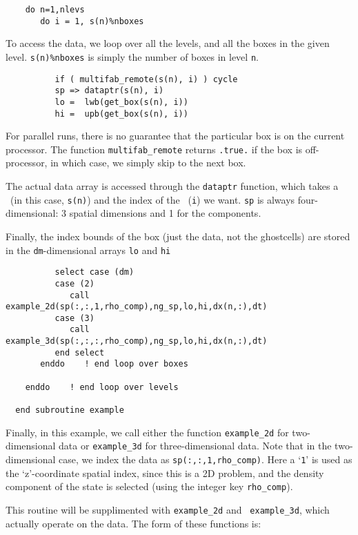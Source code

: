 \begin{verbatim}
    do n=1,nlevs
       do i = 1, s(n)%nboxes
\end{verbatim}

\noindent To access the data, we loop over all the levels, and
all the boxes in the given level.  {\tt s(n)\%nboxes} is simply
the number of boxes in level {\tt n}.

\begin{verbatim}
          if ( multifab_remote(s(n), i) ) cycle
          sp => dataptr(s(n), i)
          lo =  lwb(get_box(s(n), i))
          hi =  upb(get_box(s(n), i))
\end{verbatim}

\noindent For parallel runs, there is no guarantee that the particular
box is on the current processor.  The function {\tt multifab\_remote}
returns {\tt .true.} if the box is off-processor, in which case, we 
simply skip to the next box.

The actual data array is accessed through the {\tt dataptr} function,
which takes a \multifab\ (in this case, {\tt s(n)}) and the index of
the \boxtype\ ({\tt i}) we want.  {\tt sp} is always four-dimensional:
3 spatial dimensions and 1 for the components.

Finally, the index bounds of the box (just the data, not the ghostcells) are 
stored in the {\tt dm}-dimensional arrays {\tt lo} and {\tt hi}

\begin{verbatim}
          select case (dm)
          case (2)
             call example_2d(sp(:,:,1,rho_comp),ng_sp,lo,hi,dx(n,:),dt)
          case (3)
             call example_3d(sp(:,:,:,rho_comp),ng_sp,lo,hi,dx(n,:),dt)
          end select
       enddo    ! end loop over boxes

    enddo    ! end loop over levels

  end subroutine example
\end{verbatim}

\noindent Finally, in this example, we call either the function
{\tt example\_2d} for two-dimensional data or {\tt example\_3d}
for three-dimensional data.  Note that in the two-dimensional
case, we index the data as {\tt sp(:,:,1,rho\_comp)}.  Here a
`{\tt 1}' is used as the `z'-coordinate spatial index, since this
is a 2D problem, and the density component of the state is selected
(using the integer key {\tt rho\_comp}).

This routine will be supplimented with {\tt example\_2d} and {\tt
example\_3d}, which actually operate on the data.  The form of 
these functions is:

